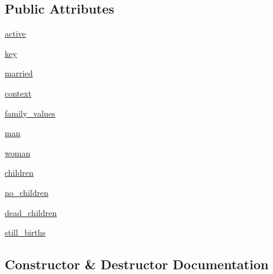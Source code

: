 \subsection*{Public Attributes}
\begin{DoxyCompactItemize}
\item 
\hyperlink{classclasses_1_1relationship_1_1Relationship_a36bf06ea05c562a25d1e97a93835413f}{active}
\item 
\hyperlink{classclasses_1_1relationship_1_1Relationship_a128c668cea8559dd35d884b369135b26}{key}
\item 
\hyperlink{classclasses_1_1relationship_1_1Relationship_a113a6a0cf7492e28fea82c208ba17129}{married}
\item 
\hyperlink{classclasses_1_1relationship_1_1Relationship_ac3a2eaabf40f516ed0ffa5c520d6f5f7}{context}
\item 
\hyperlink{classclasses_1_1relationship_1_1Relationship_a0012493c1fc556985cd525059f21102b}{family\+\_\+values}
\item 
\hyperlink{classclasses_1_1relationship_1_1Relationship_adbaa51bb0a498b8e046a3f9b9c59b4a8}{man}
\item 
\hyperlink{classclasses_1_1relationship_1_1Relationship_aa138a40b9cf69e7f4a4601d89b3a2850}{woman}
\item 
\hyperlink{classclasses_1_1relationship_1_1Relationship_a2a71e0b7a9685c7f6da06a64742578bd}{children}
\item 
\hyperlink{classclasses_1_1relationship_1_1Relationship_a48e61e0aae5d59bc9b64725644303210}{no\+\_\+children}
\item 
\hyperlink{classclasses_1_1relationship_1_1Relationship_a475e205eb7e055e0941df543fa1442dd}{dead\+\_\+children}
\item 
\hyperlink{classclasses_1_1relationship_1_1Relationship_ab23d2ad472f97e7740357d0278bff4d9}{still\+\_\+births}
\end{DoxyCompactItemize}


\subsection{Constructor \& Destructor Documentation}
\mbox{\label{classclasses_1_1relationship_1_1Relationship_a4ba683d98c8f47b1ba3e759218f02735}} 

